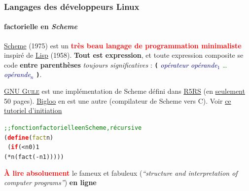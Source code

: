 \documentclass[xcolor=svgnames,final,smaller,a4]{beamer}
\begin{document}
\begin{frame}
  \frametitle{Langages des développeurs Linux}
  \framesubtitle{factorielle en \textit{Scheme}}

  \href{https://fr.wikipedia.org/wiki/Scheme}{Scheme} (1975) est un
  \textcolor{red}{\textbf{très beau langage de programmation
      minimaliste}} inspiré de
  \href{https://fr.wikipedia.org/wiki/Lisp}{Lisp} (1958). \textbf{Tout
    est expression}, et toute expression composite se code
  \textbf{entre parenthèses} \textit{toujours significatives} :
  \texttt{\textbf{(}} \textcolor{Navy}{\textit{opérateur}}
  \textcolor{Navy}{\textit{opérande}$_1$} \textcolor{green}{\dots}
  \textcolor{Navy}{\textit{opérande}$_n$}
  \texttt{\textbf{)}}. 

  \vspace{0.3cm}
  
\href{https://www.gnu.org/software/guile/}{GNU \textsc{Guile}} est une
implémentation de Scheme défini dans
\href{https://schemers.org/Documents/Standards/R5RS/}{R5RS} (en
\href{https://schemers.org/Documents/Standards/R5RS/r5rs.pdf}{seulement}
50 pages). \href{https://www-sop.inria.fr/mimosa/fp/Bigloo/}{Bigloo}
en est une autre (compilateur de Scheme vers C). Voir
\href{http://starynkevitch.net/Basile/guile-tutorial-1.html}{ce
  tutoriel d'initiation}
    
  \begin{alltt}
    \textcolor{green}{;; fonction factorielle en Scheme, récursive}\\
    (\textcolor{red}{\textbf{define}} (\textcolor{Olive}{fact} n)\\
    ~ (\textcolor{red}{\textbf{if}} (< n 0) 1\\
    \hspace{0.5cm}(* n (fact (- n 1)))))
  \end{alltt}

  \vspace{0.3cm}

  {\large \textcolor{red}{\textbf{À lire absoluement}} le fameux et fabuleux \href{https://mitpress.mit.edu/sites/default/files/sicp/index.html}{}}
  (\textit{``structure and interpretation of computer programs''}) \textbf{en ligne} {}
  
\end{frame}
\end{document}
